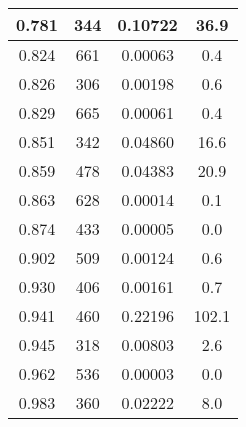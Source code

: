 \begin{longtable}{c | c | c | c}
0.781 &  344 & 0.10722 & 36.9 \\ \hline 
0.824 &  661 & 0.00063 &  0.4 \\ \hline 
0.826 &  306 & 0.00198 &  0.6 \\ \hline 
0.829 &  665 & 0.00061 &  0.4 \\ \hline 
0.851 &  342 & 0.04860 & 16.6 \\ \hline 
0.859 &  478 & 0.04383 & 20.9 \\ \hline 
0.863 &  628 & 0.00014 &  0.1 \\ \hline 
0.874 &  433 & 0.00005 &  0.0 \\ \hline 
0.902 &  509 & 0.00124 &  0.6 \\ \hline 
0.930 &  406 & 0.00161 &  0.7 \\ \hline 
0.941 &  460 & 0.22196 & 102.1 \\ \hline 
0.945 &  318 & 0.00803 &  2.6 \\ \hline 
0.962 &  536 & 0.00003 &  0.0 \\ \hline 
0.983 &  360 & 0.02222 &  8.0 \\ \hline 
\end{longtable}